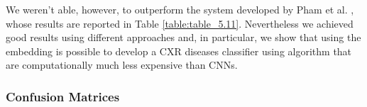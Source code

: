\begin{table}[h!]
\centering
{}
\caption[Chexpert AUROC comparison]{AUROC comparison with Chexpert author's model (for simplicity we only report, among the results they obtained, the one with the highest mean AUROC).}
\label{table:table_5.10}
\end{table}

We weren't able, however, to outperform the system developed by Pham et al. \cite{pham2019interpreting}, whose results are reported in Table \ref{table:table_5.11}. Nevertheless we achieved good results using different approaches and, in particular, we show that using the embedding is possible to develop a \ac{CXR} diseases classifier using algorithm that are computationally much less expensive than \acp{CNN}.


\begin{table}[h!]
\centering
{}
\caption[Pham et al. AUROC comparison ]{AUROC comparison with Pham et al. model.}
\label{table:table_5.11}
\end{table}

\subsubsection{Confusion Matrices}

